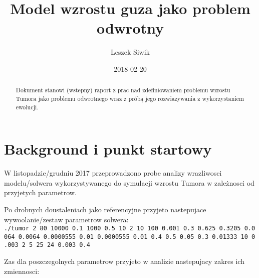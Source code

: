\documentclass[]{article}
\title{Model wzrostu guza jako problem odwrotny}
\author{Leszek Siwik}
\date{2018-02-20}
\begin{document}
\maketitle
\begin{abstract}
Dokument stanowi (wstepny) raport z prac nad zdefiniowaniem problemu
wzrostu Tumora jako problemu odwrotnego wraz z próbą jego rozwiazywania
z wykorzystaniem ewolucji.
\end{abstract}

{
\setcounter{tocdepth}{3}
\tableofcontents
}
\newpage

\section{Background i punkt startowy}\label{background-i-punkt-startowy}

\label{sec:start} W listopadzie/grudniu 2017 przeprowadzono probe
analizy wrazliwosci modelu/solwera wykorzystywanego do symulacji wzrostu
Tumora w zależnosci od przyjetych parametrow.

Po drobnych doustaleniach jako referencyjne przyjeto nastepujace
wywoolanie/zestaw parametrow solwera:
\texttt{./tumor\ 2\ 80\ 10000\ 0.1\ 1000\ 0.5\ 10\ 2\ 10\ 100\ 0.001\ 0.3\ 0.625\ 0.3205\ 0.0064\ 0.0064\ 0.0000555\ 0.01\ 0.0000555\ 0.01\ 0.4\ 0.5\ 0.05\ 0.3\ 0.01333\ 10\ 0.003\ 2\ 5\ 25\ 24\ 0.003\ 0.4}

Zas dla poszczegolnych parametrow przyjeto w analizie nastepujacy zakres
ich zmiennosci:
\end{document}

